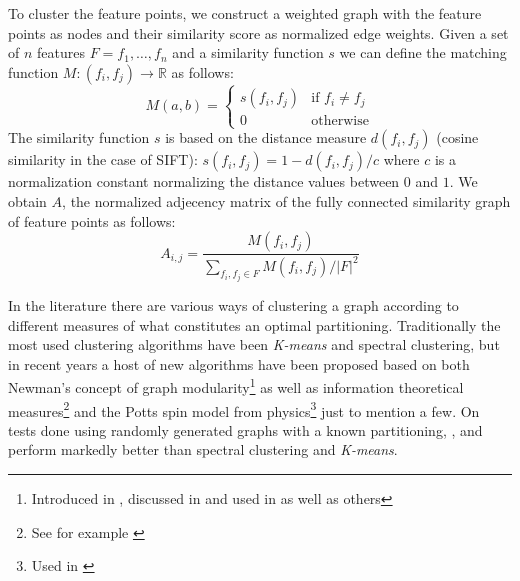 To cluster the feature points, we construct a weighted graph with the 
feature points as nodes and their similarity score as normalized edge 
weights.  Given a set of $n$ features $F = {f_1, \ldots, f_n}$ and a 
similarity function $s$ we can define the matching function $M : (f_i, 
f_j) \rightarrow \mathbb{R}$ as follows:
\begin{equation*}
    M(a,b) = \begin{cases} s(f_i, f_j) & \mbox{if } f_i \neq f_j \\ 0 & 
    \mbox{otherwise}
	\end{cases}
\end{equation*}
The similarity function $s$ is based on the distance measure 
$d(f_i,f_j)$ (cosine similarity in the case of SIFT): $s(f_i, f_j) = 1 - 
d(f_i,f_j) / c$ where $c$ is a normalization constant normalizing the 
distance values between $0$ and $1$.
We obtain $A$, the normalized adjecency matrix of the fully connected 
similarity graph of feature points as follows:
\begin{equation*}
    A_{i,j} = \frac{M(f_i, f_j)}{\sum\limits_{f_i,f_j \in F} M(f_i, f_j) 
    / \left\vert F \right\vert ^ {2}}
\end{equation*}

In the literature there are various ways of clustering a graph according 
to different measures of what constitutes an optimal partitioning.  
Traditionally the most used clustering algorithms have been 
\emph{K-means} and spectral clustering, but in recent years a host of 
new algorithms have been proposed based on both Newman's concept of 
graph modularity\footnote{Introduced in \cite{girvan2002}, discussed in 
\cite{brandes2007} and used in \cite{blondel2008} as well as others} as 
well as information theoretical measures\footnote{See for example 
\cite{rosvall2008}} and the Potts spin model from physics\footnote{Used 
in \cite{ronhovde2009}} just to mention a few.  On tests done using 
randomly generated graphs with a known partitioning, \cite{blondel2008}, 
\cite{rosvall2008} and \cite{ronhovde2009} perform markedly better than 
spectral clustering and \emph{K-means}\cite{lancichinetti2009}.


